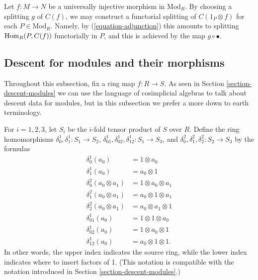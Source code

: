 \begin{remark}
\label{remark-functorial-splitting}
Let $f: M \to N$ be a universally injective morphism in $\text{Mod}_R$. By 
choosing a splitting
$g$ of $C(f)$, we may construct a functorial splitting of $C(1_P \otimes f)$ 
for each $P \in \text{Mod}_R$.
Namely, by (\ref{equation-adjunction}) this amounts to splitting $\mathop{\mathrm{Hom}}\nolimits_R(P, 
C(f))$  functorially in $P$,
and this is achieved by the map $g \circ \bullet$.
\end{remark}


\subsection{Descent for modules and their morphisms}
\label{subsection-descent-modules-morphisms}

\noindent
Throughout this subsection, fix a ring map $f: R \to S$. As seen in
Section \ref{section-descent-modules} we can use the language of cosimplicial
algebras to talk about descent data for modules, but in this
subsection we prefer a more down to earth terminology.

\medskip\noindent
For $i = 1, 2, 3$, let $S_i$ be the $i$-fold tensor product of $S$ over $R$.
Define the ring homomorphisms $\delta_0^1, \delta_1^1: S_1 \to S_2$,
$\delta_{01}^1, \delta_{02}^1, \delta_{12}^1: S_1 \to S_3$, and
$\delta_0^2, \delta_1^2, \delta_2^2: S_2 \to S_3$ by the formulas
\begin{align*}
\delta^1_0  (a_0) & =  1 \otimes a_0 \\
\delta^1_1  (a_0) & = a_0 \otimes 1 \\
\delta^2_0  (a_0 \otimes a_1) & =  1 \otimes a_0 \otimes a_1 \\
\delta^2_1  (a_0 \otimes a_1) & =  a_0 \otimes 1 \otimes a_1 \\
\delta^2_2  (a_0 \otimes a_1) & =  a_0 \otimes a_1 \otimes 1 \\
\delta_{01}^1(a_0) & = 1 \otimes 1 \otimes a_0 \\
\delta_{02}^1(a_0) & = 1 \otimes a_0 \otimes 1 \\
\delta_{12}^1(a_0) & = a_0 \otimes 1 \otimes 1.
\end{align*}
In other words, the upper index indicates the source ring, while the lower 
index indicates where to insert factors of 1. (This notation is compatible
with the notation introduced in Section \ref{section-descent-modules}.)

